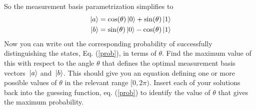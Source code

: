 \documentclass[10pt]{article}
\begin{document}
	 So the measurement basis parametrization simplifies to 
	 \begin{align*}
	 \ket*{a} &=  \cos(\theta) \ket*{0} + \sin(\theta) \ket*{1} \\
	 \ket*{b} &= \sin(\theta) \ket*{0} - \cos(\theta) \ket*{1} 
	 \end{align*} 
	 Now you can write out the corresponding probability of successfully distinguishing the states, Eq. 
	 (\ref{prob}), in terms of \( \theta \). Find the maximum value of this with respect to the angle \( \theta \) 
	 that defines the optimal measurement basis vectors \( \ket*{a} \) and \( \ket*{b} \). This should give 
	 you an equation defining one or more possible values of \( \theta \) in the relevant range 
	 \( [0, 2\pi) \). Insert each of your solutions back into the guessing function, 
	 eq. (\ref{prob}) to identify the value of \( \theta \) that gives the maximum probability.
\end{document}
